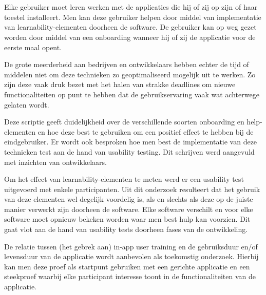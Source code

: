


\chapter*{}

Elke gebruiker moet leren werken met de applicaties die hij of zij op zijn of haar toestel installeert. Men kan deze gebruiker helpen door middel van implementatie van learnability-elementen doorheen de software. De gebruiker kan op weg gezet worden door middel van een onboarding wanneer hij of zij de applicatie voor de eerste maal opent.

De grote meerderheid aan bedrijven en ontwikkelaars hebben echter de tijd of middelen niet om deze technieken zo geoptimaliseerd mogelijk uit te werken. Zo zijn deze vaak druk bezet met het halen van strakke deadlines om nieuwe functionaliteiten op punt te hebben dat de gebruikservaring vaak wat achterwege gelaten wordt.

Deze scriptie geeft duidelijkheid over de verschillende soorten onboarding en help-elementen en hoe deze best te gebruiken om een positief effect te hebben bij de eindgebruiker. Er wordt ook besproken hoe men best de implementatie van deze technieken test aan de hand van usability testing. Dit schrijven werd aangevuld met inzichten van ontwikkelaars.

Om het effect van learnability-elementen te meten werd er een usability test uitgevoerd met enkele participanten. Uit dit onderzoek resulteert dat het gebruik van deze elementen wel degelijk voordelig is, als en slechts als deze op de juiste manier verwerkt zijn doorheen de software. Elke software verschilt en voor elke software moet opnieuw bekeken worden waar men best hulp kan voorzien. Dit gaat vlot aan de hand van usability tests doorheen fases van de ontwikkeling.

De relatie tussen (het gebrek aan) in-app user training en de gebruiksduur en/of levensduur van de applicatie wordt aanbevolen als toekomstig onderzoek. Hierbij kan men deze proef als startpunt gebruiken met een gerichte applicatie en een steekproef waarbij elke participant interesse toont in de functionaliteiten van de applicatie.
